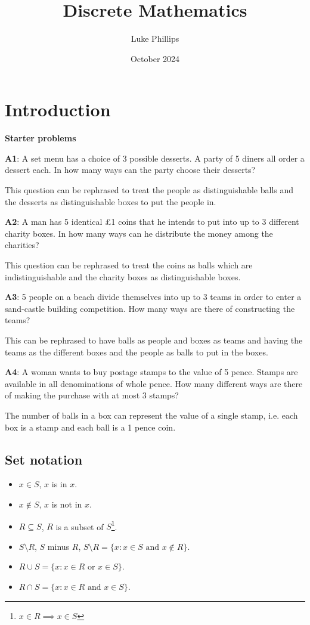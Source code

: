 \documentclass[10pt, a4paper]{article}
\title{Discrete Mathematics}
\author{Luke Phillips}
\date{October 2024}
\begin{document}
\maketitle

\newpage

\section{Introduction}

\textbf{Starter problems}

\textbf{A1}: A set menu has a choice of 3 possible desserts. A party of 5 diners all order
a dessert each. In how many ways can the party choose their desserts?

This question can be rephrased to treat the people as distinguishable balls and the desserts as distinguishable boxes to put the people in.

\textbf{A2}: A man has 5 identical £1 coins that he intends to put into up to 3 different
charity boxes. In how many ways can he distribute the money among the
charities?

This question can be rephrased to treat the coins as balls which are indistinguishable and the charity boxes as distinguishable boxes.

\textbf{A3}: 5 people on a beach divide themselves into up to 3 teams in order to enter a
sand-castle building competition. How many ways are there of constructing
the teams?

This can be rephrased to have balls as people and boxes as teams and having the teams as the different boxes and the people as balls to put in the boxes.

\textbf{A4}: A woman wants to buy postage stamps to the value of 5 pence. Stamps are
available in all denominations of whole pence. How many different ways are
there of making the purchase with at most 3 stamps?

The number of balls in a box can represent the value of a single stamp, i.e. each box is a stamp and each ball is a 1 pence coin.

\subsection{Set notation}
\begin{itemize}
    \item $x \in S$, $x$ is in $x$.
    \item $x \notin S$, $x$ is not in $x$.
    \item $R \subseteq S$, $R$ is a subset of $S$\footnote{$x \in R \implies x \in S$}.
    \item $S \setminus R$, $S$ minus $R$, $S \setminus R = \{x: x \in S \text{ and } x \notin R\}$.
    \item $R \cup S =  \{x : x \in R \text{ or } x \in S\}$.
    \item $R \cap S =  \{x : x \in R \text{ and } x \in S\}$.
\end{itemize}
\end{document}
